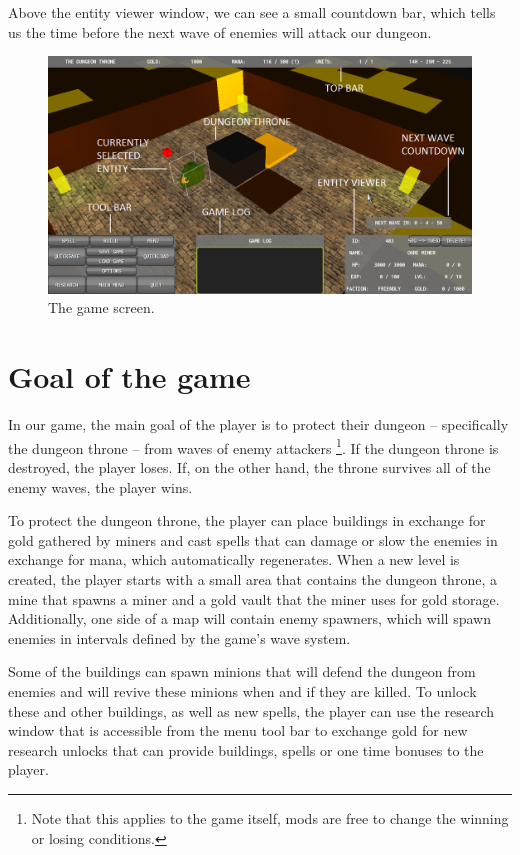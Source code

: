 Above the entity viewer window, we can see a small countdown bar, which tells us the time before the next wave of enemies will attack our
dungeon.

\begin{figure}[H]
    \centering
    \includegraphics[width=\textwidth]{../img/gui-full-text.png}
    \caption{The game screen.}
    \label{gui-full}
\end{figure}

\section{Goal of the game}

In our game, the main goal of the player is to protect their dungeon -- specifically the dungeon throne -- from waves of enemy attackers
\footnote{Note that this applies to the game itself, mods are free to change the winning or losing conditions.}.
If the dungeon throne is destroyed, the player loses. If, on the other hand, the throne survives all of the enemy waves, the player wins.

To protect the dungeon throne, the player can place buildings in exchange for gold gathered by miners and cast spells that can damage or slow
the enemies in exchange for mana, which automatically regenerates. When a new level is created, the player starts with a small area that
contains the dungeon throne, a mine that spawns a miner and a gold vault that the miner uses for gold storage. Additionally, one side of a
map will contain enemy spawners, which will spawn enemies in intervals defined by the game's wave system.

Some of the buildings can spawn minions that will defend the dungeon from enemies and will revive these minions when and if they are killed.
To unlock these and other buildings, as well as new spells, the player can use the research window that is accessible from the menu tool
bar to exchange gold for new research unlocks that can provide buildings, spells or one time bonuses to the player.

